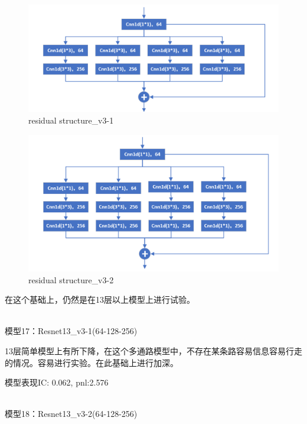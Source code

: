 \documentclass[11pt]{ctexart}
\begin{document}
\begin{figure}[H]

\begin{center}
\includegraphics[width=1.0\textwidth]{residual4-1.PNG}
\end{center}
\caption{residual structure\_v3-1}
\label{FIG.4}
\end{figure}

\begin{figure}[H]

\begin{center}
\includegraphics[width=1.0\textwidth]{residual4-2.PNG}
\end{center}
\caption{residual structure\_v3-2}
\label{FIG.5}
\end{figure}

在这个基础上，仍然是在13层以上模型上进行试验。

~\\
模型17：Resnet13\_v3-1(64-128-256)

13层简单模型上有所下降，在这个多通路模型中，不存在某条路容易信息容易行走的情况。容易进行实验。在此基础上进行加深。

模型表现{\kaishu \small IC: 0.062, pnl:2.576}

~\\
模型18：Resnet13\_v3-2(64-128-256)
\end{document}
